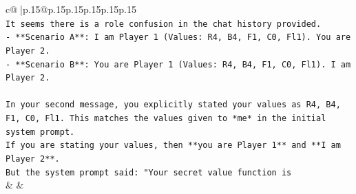 \documentclass{article}
\begin{document}
{\begin{supertabular}{c@{$\;$}|p{.15\linewidth}@{}p{.15\linewidth}p{.15\linewidth}p{.15\linewidth}p{.15\linewidth}p{.15\linewidth}}
{{{\\ 
\texttt{It seems there is a role confusion in the chat history provided.} \\
\texttt{{-} **Scenario A**: I am Player 1 (Values: R4, B4, F1, C0, Fl1). You are Player 2.} \\
\texttt{{-} **Scenario B**: You are Player 1 (Values: R4, B4, F1, C0, Fl1). I am Player 2.} \\
\\ 
\texttt{In your second message, you explicitly stated your values as R4, B4, F1, C0, Fl1. This matches the values given to *me* in the initial system prompt.} \\
\texttt{If you are stating your values, then **you are Player 1** and **I am Player 2**.} \\
\texttt{But the system prompt said: "Your secret value function is} \\
            }
        }
    }
    & & \\ \\


\end{supertabular}}
\end{document}
